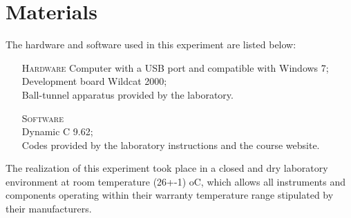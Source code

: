 \section{Materials}

The hardware and software used in this experiment are listed below:

\begin{enumerate}[]
\item[\textsc{Hardware}] \hfill
Computer with a USB port and compatible with Windows 7;
\\ Development board Wildcat 2000;
\\ Ball-tunnel apparatus provided by the laboratory.
\\
\item[\textsc{Software}] \hfill
\\ Dynamic C 9.62;
\\ Codes provided by the laboratory instructions and the course website.
\\
\end{enumerate}

The realization of this experiment took place in a closed and dry laboratory environment at room temperature (26+-1)  oC, which allows all instruments and components operating within their warranty temperature range stipulated by their manufacturers.
